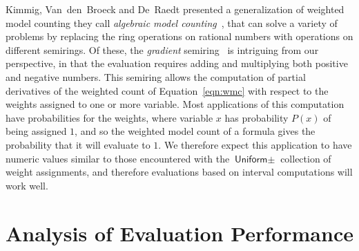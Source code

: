 \documentclass[letterpaper,USenglish,cleveref, autoref, thm-restate]{lipics-v2021}
\begin{document}
Kimmig, Van~den~Broeck and De~Raedt presented a generalization of
weighted model counting they call \emph{algebraic model
counting}~\cite{kimmig:jal:2017}, that can solve a variety of
problems by replacing the ring operations on rational numbers with
operations on different semirings.  Of these, the \emph{gradient}
semiring~\cite{eisner:acl:2002} is intriguing from our perspective, in that the evaluation requires adding and multiplying both positive and negative numbers.
This semiring allows the computation
of partial derivatives of the weighted count of Equation~\ref{eqn:wmc}
with respect to the weights assigned to one or more variable.
Most applications of this computation have probabilities for the
weights, where variable $x$ has probability $P(x)$ of being assigned $1$, and
so the weighted model count of a formula gives the probability that it will
evaluate to $1$.  We therefore expect this application to have numeric
values similar to those encountered with the $\textsf{Uniform$\pm$}$
collection of weight assignments, and therefore evaluations based on interval computations will work well.



\newpage


\newpage
\appendix

\section{Analysis of Evaluation Performance}
\label{app:performance}
\end{document}
